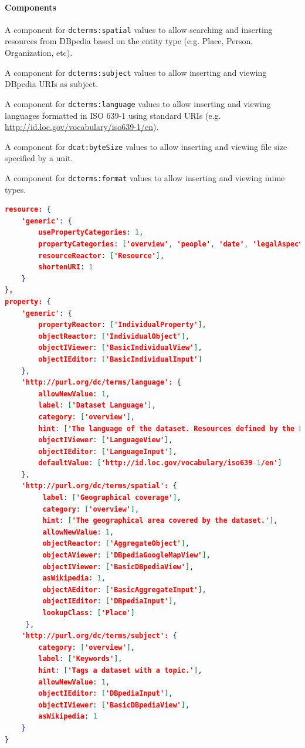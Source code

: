 \documentclass{acm_proc_article-sp}
\begin{document}
\paragraph{Components}
\begin{compactitem}
 \item A component for \texttt{dcterms:spatial} values to allow searching and inserting resources from DBpedia based on the entity type (e.g. Place, Person, Organization, etc).
 \item A component for \texttt{dcterms:subject} values to allow inserting and viewing DBpedia URIs as subject.
 \item A component for \texttt{dcterms:language} values to allow inserting and viewing languages formatted in ISO 639-1 using standard URIs (e.g. \url{http://id.loc.gov/vocabulary/iso639-1/en}).
 \item A component for \texttt{dcat:byteSize} values to allow inserting and viewing file size specified by a unit.
  \item A component for \texttt{dcterms:format} values to allow inserting and viewing mime types.
\end{compactitem}

\begin{lstlisting}[language=json,firstnumber=1, caption=An excerpt of LD-R config for RISIS]
resource: {
    'generic': {
        usePropertyCategories: 1,
        propertyCategories: ['overview', 'people', 'date', 'legalAspects', 'technicalAspects', 'structuralAspects'],
        resourceReactor: ['Resource'],
        shortenURI: 1
    }
},
property: {
    'generic': {
        propertyReactor: ['IndividualProperty'],
        objectReactor: ['IndividualObject'],
        objectIViewer: ['BasicIndividualView'],
        objectIEditor: ['BasicIndividualInput']
    },
    'http://purl.org/dc/terms/language': {
        allowNewValue: 1,
        label: ['Dataset Language'],
        category: ['overview'],
        hint: ['The language of the dataset. Resources defined by the Library of Congress (http://id.loc.gov/vocabulary/iso639-1.html, http://id.loc.gov/vocabulary/iso639-2.html) SHOULD be used.'],
        objectIViewer: ['LanguageView'],
        objectIEditor: ['LanguageInput'],
        defaultValue: ['http://id.loc.gov/vocabulary/iso639-1/en']
    },
    'http://purl.org/dc/terms/spatial': {
         label: ['Geographical coverage'],
         category: ['overview'],
         hint: ['The geographical area covered by the dataset.'],
         allowNewValue: 1,
         objectReactor: ['AggregateObject'],
         objectAViewer: ['DBpediaGoogleMapView'],
         objectIViewer: ['BasicDBpediaView'],
         asWikipedia: 1,
         objectAEditor: ['BasicAggregateInput'],
         objectIEditor: ['DBpediaInput'],
         lookupClass: ['Place']
     },
    'http://purl.org/dc/terms/subject': {
        category: ['overview'],
        label: ['Keywords'],
        hint: ['Tags a dataset with a topic.'],
        allowNewValue: 1,
        objectIEditor: ['DBpediaInput'],
        objectIViewer: ['BasicDBpediaView'],
        asWikipedia: 1
    }    
}
\end{lstlisting}
\end{document}
